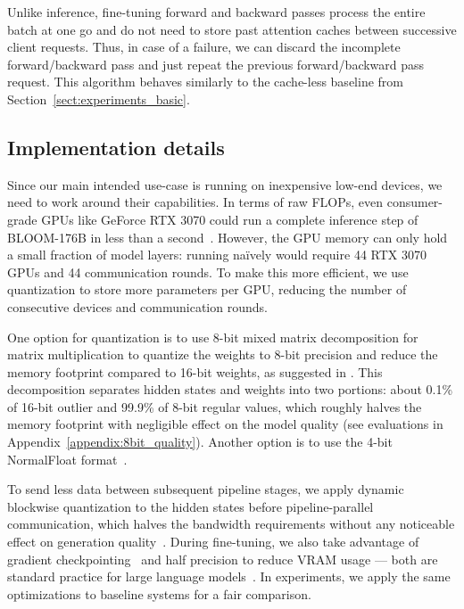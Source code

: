 Unlike inference, fine-tuning forward and backward passes process the entire batch at one go and do not need to store past attention caches between successive client requests. Thus, in case of a failure, we can discard the incomplete forward/backward pass and just repeat the previous forward/backward pass request. This algorithm behaves similarly to the cache-less baseline from Section~\ref{sect:experiments_basic}.

\subsection{Implementation details}\label{sect:method_implementation}
Since our main intended use-case is running on inexpensive low-end devices, we need to work around their capabilities.
In terms of raw FLOPs, even consumer-grade GPUs like GeForce RTX 3070 could run a complete inference step of BLOOM-176B in less than a second~\citep{ga102-datasheet}. However, the GPU memory can only hold a small fraction of model layers: running na\"ively would require 44 RTX 3070 GPUs and 44 communication rounds.
To make this more efficient, we use quantization to store more parameters per GPU, reducing the number of consecutive devices and communication rounds.

One option for quantization is to use 8-bit mixed matrix decomposition for matrix multiplication to quantize the weights to 8-bit precision and reduce the memory footprint compared to 16-bit weights, as suggested in \cite{dettmers2022llm}. This decomposition separates hidden states and weights into two portions: about 0.1\% of 16-bit outlier and 99.9\% of 8-bit regular values, which roughly halves the memory footprint with negligible effect on the model quality (see evaluations in Appendix~\ref{appendix:8bit_quality}). Another option is to use the 4-bit NormalFloat format~\citep{dettmers2023qlora}.

To send less data between subsequent pipeline stages, we apply dynamic blockwise quantization \citep{dettmers2022optimizers} to the hidden states before pipeline-parallel communication, which halves the bandwidth requirements without any noticeable effect on generation quality~\citep{ryabinin2023swarm}.
During fine-tuning, we also take advantage of gradient checkpointing~\citep{gradient_checkpointing_autograd,gradient_checkpointing_dl} and half precision to reduce VRAM usage --- both are standard practice for large language models~\citep{megatron2,gpt3,varuna}. In experiments, we apply the same optimizations to baseline systems for a fair comparison.
